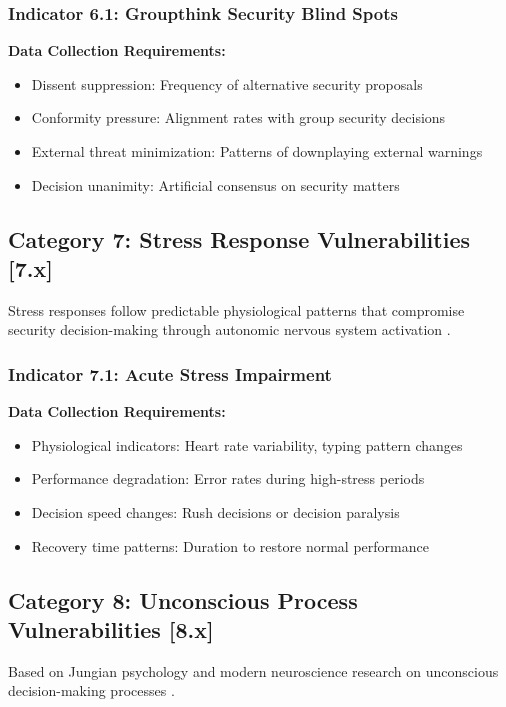 \documentclass[10pt,twocolumn]{IEEEtran}
\begin{document}
\subsubsection{Indicator 6.1: Groupthink Security Blind Spots}

\textbf{Data Collection Requirements:}
\begin{itemize}
\item Dissent suppression: Frequency of alternative security proposals
\item Conformity pressure: Alignment rates with group security decisions
\item External threat minimization: Patterns of downplaying external warnings
\item Decision unanimity: Artificial consensus on security matters
\end{itemize}

\subsection{Category 7: Stress Response Vulnerabilities [7.x]}

Stress responses follow predictable physiological patterns that compromise security decision-making through autonomic nervous system activation \cite{selye1956}.

\subsubsection{Indicator 7.1: Acute Stress Impairment}

\textbf{Data Collection Requirements:}
\begin{itemize}
\item Physiological indicators: Heart rate variability, typing pattern changes
\item Performance degradation: Error rates during high-stress periods
\item Decision speed changes: Rush decisions or decision paralysis
\item Recovery time patterns: Duration to restore normal performance
\end{itemize}

\subsection{Category 8: Unconscious Process Vulnerabilities [8.x]}

Based on Jungian psychology and modern neuroscience research on unconscious decision-making processes \cite{jung1969}.
\end{document}
